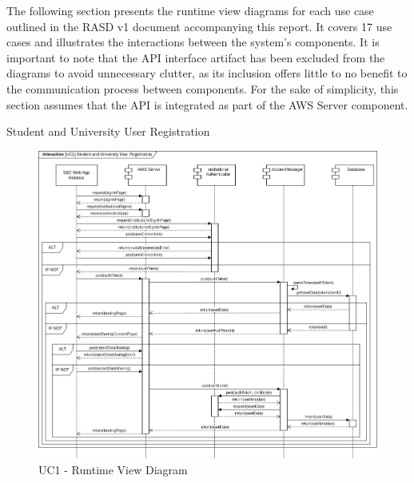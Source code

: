 The following section presents the runtime view diagrams for each use case outlined in the RASD v1 document accompanying this report. It covers 17 use cases and illustrates the interactions between the system's components. It is important to note that the API interface artifact has been excluded from the diagrams to avoid unnecessary clutter, as its inclusion offers little to no benefit to the communication process between components. For the sake of simplicity, this section assumes that the API is integrated as part of the AWS Server component.
\newpage
\begin{enumerate}[label={[UC\arabic*]}]
    \item Student and University User Registration
    \begin{figure}[h]
        \centering
        \includegraphics[width=1\linewidth]{DD-Latex//assets//Runtime View Diagrams/UC1.jpg}
        \caption{UC1 - Runtime View Diagram}
        \label{fig:UC1}
    \end{figure}
    

\end{enumerate}
